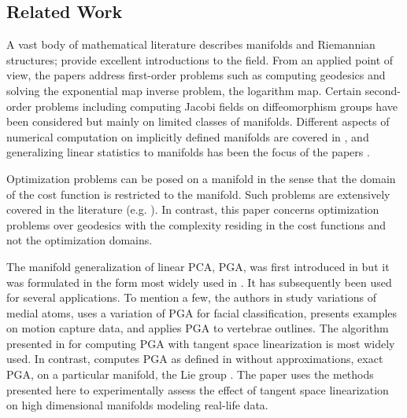 \documentclass[final]{svjour3}
\begin{document}
\subsection{Related Work}
\label{sec:related}
A vast body of mathematical literature describes manifolds and Riemannian
structures; 
\cite{do_carmo_riemannian_1992,lee_riemannian_1997} provide
excellent introductions to the field. From an applied point of view, the papers
\cite{dedieu_symplectic_2005,herbert_bishop_keller_numerical_1968,noakes_global_1998,klassen_geodesics_2006,schmidt_shape_2006,sommer_bicycle_2009}
address first-order problems such as computing geodesics and solving the
exponential map inverse problem, the logarithm map.
Certain second-order problems including computing Jacobi fields on
diffeomorphism groups \cite{younes_evolutions_2009,ferreira_newton_2008}
have been considered but mainly on limited classes of manifolds. 
Different aspects of numerical computation on implicitly defined manifolds are covered in
\cite{zhang_curvature_2007,rheinboldt_manpak:_1996,rabier_computational_1990},
and generalizing linear statistics to manifolds has been the focus of the papers
\cite{karcher_riemannian_1977,pennec_intrinsic_2006,fletcher_robust_2008,fletcher_principal_2004-1,huckemann_intrinsic_2010}.

Optimization problems can be posed on a manifold in the sense that the domain of
the cost function is restricted to the manifold.
Such problems are extensively covered in the literature 
(e.g. \cite{luenberger_gradient_1972,yang_globally_2007}). In contrast, this
paper concerns
optimization problems over geodesics with the complexity residing in 
the cost functions and not the optimization
domains.

The manifold generalization of linear PCA, PGA, was first introduced in
\cite{fletcher_statistics_2003} but it was formulated in the form most widely used in
\cite{fletcher_principal_2004-1}. It has subsequently been used for several
applications. To mention a few, the authors in 
\cite{fletcher_principal_2004-1,fletcher_principal_2004} study
variations of medial atoms, \cite{wu_weighted_2008} uses a variation
of PGA for facial classification, \cite{said_exact_2007} presents examples on
motion capture data, and \cite{sommer_bicycle_2009} applies PGA to vertebrae
outlines. 
The algorithm presented in \cite{fletcher_principal_2004-1} for computing PGA with tangent space
linearization is most widely used. 
In contrast, \cite{said_exact_2007} computes PGA as
defined in \cite{fletcher_statistics_2003} without approximations, exact PGA, on
a particular 
manifold, the Lie group . The paper
\cite{sommer_manifold_2010} uses the methods presented here to experimentally
assess the effect of tangent space linearization
on high dimensional manifolds modeling real-life
data.
\end{document}
